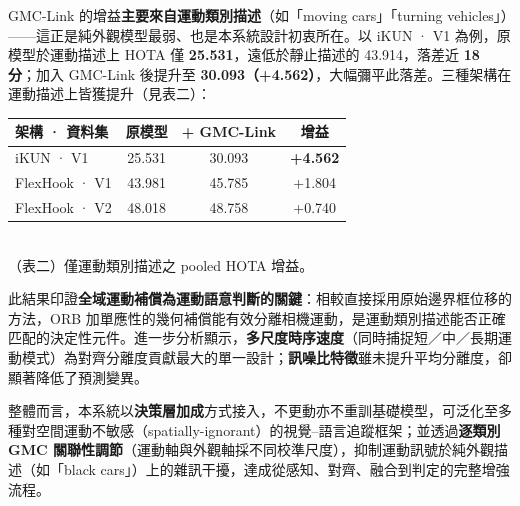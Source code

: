 \documentclass[12pt]{article}
\begin{document}
GMC-Link 的增益\textbf{主要來自運動類別描述}（如「moving cars」「turning vehicles」）——這正是純外觀模型最弱、也是本系統設計初衷所在。以 iKUN · V1 為例，原模型於運動描述上 HOTA 僅 \textbf{25.531}，遠低於靜止描述的 43.914，落差近 \textbf{18 分}；加入 GMC-Link 後提升至 \textbf{30.093（+4.562）}，大幅彌平此落差。三種架構在運動描述上皆獲提升（見表二）：

\begin{center}
  \small
  \begin{tabular}{l c c c}
    \hline
    架構 · 資料集      & 原模型    & + GMC-Link & 增益              \\
    \hline
    iKUN · V1     & 25.531 & 30.093  & \textbf{+4.562} \\
    FlexHook · V1 & 43.981 & 45.785  & +1.804          \\
    FlexHook · V2 & 48.018 & 48.758  & +0.740          \\
    \hline
  \end{tabular}\\[3pt]
  {\small （表二）僅運動類別描述之 pooled HOTA 增益。}
\end{center}

此結果印證\textbf{全域運動補償為運動語意判斷的關鍵}：相較直接採用原始邊界框位移的方法，ORB 加單應性的幾何補償能有效分離相機運動，是運動類別描述能否正確匹配的決定性元件。進一步分析顯示，\textbf{多尺度時序速度}（同時捕捉短／中／長期運動模式）為對齊分離度貢獻最大的單一設計；\textbf{訊噪比特徵}雖未提升平均分離度，卻顯著降低了預測變異。

整體而言，本系統以\textbf{決策層加成}方式接入，不更動亦不重訓基礎模型，可泛化至多種對空間運動不敏感（spatially-ignorant）的視覺--語言追蹤框架；並透過\textbf{逐類別 GMC 關聯性調節}（運動軸與外觀軸採不同校準尺度），抑制運動訊號於純外觀描述（如「black cars」）上的雜訊干擾，達成從感知、對齊、融合到判定的完整增強流程。
\end{document}
